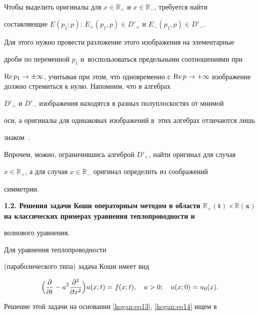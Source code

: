 Чтобы выделить оригиналы для $x\in \mathbb R_+$ и $x\in \mathbb  R_-$, требуется найти 

составляющие $E(p_1;p )$: $E_+ (p_1,p ) \in D'_+$ и $E_- (p_1 ,p ) \in D'_-$.

Для этого нужно провести разложение этого изображения на элементарные 

дроби по переменной $p_1$ и~воспользоваться предельными соотношениями при 

$\mathop{\rm Re} p_1 \to \pm \infty$, учитывая при этом, что одновременно с $\mathop{\rm Re} p\to 

+\infty$ изображение должно стремиться к нулю. Напомним, что в алгебрах 

$D'_+$ и $D'_-$ изображения находятся в разных полуплоскостях от мнимой 

оси, а оригиналы для одинаковых изображений в~этих алгебрах отличаются лишь 

знаком~\cite{kogan:bib15,kogan:bib16}. 



Впрочем, можно, ограничившись алгеброй $D'_+$, найти оригинал для случая 

$x \in \mathbb R_+$, а для случая $x\in \mathbb R_-$ оригинал определить из соображений 

симметрии.



\smallskip



{\bf 1.2. Решения задачи Коши операторным методом в области \linebreak $\boldsymbol{\mathbb R_+ (t) \times} \boldsymbol{\mathbb  R(x)}$ на классических примерах уравнения теплопроводности и 

волнового уравнения.} Для уравнения теплопроводности 

(параболического типа) задача Коши имеет вид 

\begin{equation}

\label{kogan:eq20}

\Bigl( \frac{\partial }{\partial t}-a^2\frac{\partial ^2}{\partial x^2} \Bigr)u(x;t)=f(x;t),

\quad

a>0;

\quad

u(x;0)=u_0 (x).

\end{equation}

Решение этой задачи на основании \eqref{kogan:eq13}, \eqref{kogan:eq14} ищем в 

